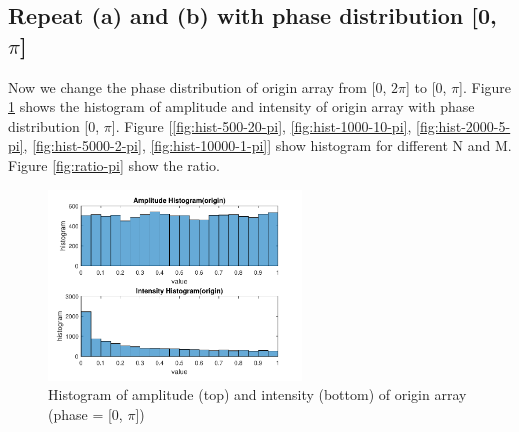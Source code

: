\documentclass{article}
\begin{document}
\subsection{Repeat (a) and (b) with phase distribution [0, $\pi$]}
Now we change the phase distribution of origin array from [0, $2\pi$] to [0, $\pi$]. Figure \ref{fig:hist-origin-pi} shows the histogram of 
amplitude and intensity of origin array with phase distribution [0, $\pi$]. 
Figure [\ref{fig:hist-500-20-pi}, \ref{fig:hist-1000-10-pi}, \ref{fig:hist-2000-5-pi}, \ref{fig:hist-5000-2-pi}, \ref{fig:hist-10000-1-pi}]
show histogram for different N and M.  Figure \ref{fig:ratio-pi} show the ratio.

\begin{figure}[H]
	\centering
	\includegraphics[width = 0.6\textwidth]{src/pi/hist_origin.pdf}
	\caption{Histogram of amplitude (top) and intensity (bottom) of origin array (phase = [0, $\pi$])}
	\label{fig:hist-origin-pi}
\end{figure}
\end{document}
